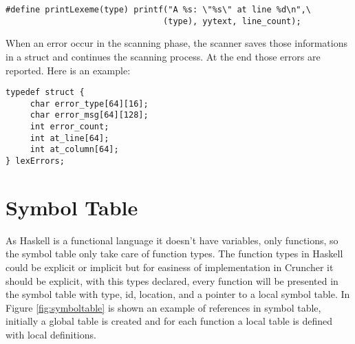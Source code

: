 \documentclass{article}
\begin{document}
\begin{verbatim}
#define printLexeme(type) printf("A %s: \"%s\" at line %d\n",\
                                (type), yytext, line_count);
\end{verbatim}

When an error occur in the scanning phase, the scanner saves those informations
in a struct and continues the scanning process. At the end those errors are
reported. Here is an example:

\begin{verbatim}
typedef struct {
     char error_type[64][16];
     char error_msg[64][128];
     int error_count;
     int at_line[64];
     int at_column[64];
} lexErrors;
\end{verbatim}

\section{Symbol Table}
As Haskell is a functional language it doesn't have variables, only functions,
so the symbol table only take care of function types. The function types in
Haskell could be explicit or implicit but for easiness of implementation in
Cruncher it should be explicit, with this types declared, every function will
be presented in the symbol table with type, id, location, and a pointer to a
local symbol table. In Figure \ref{fig:symboltable} is shown an example of
references in symbol table, initially a global table is created and for each
function a local table is defined with local definitions.
\end{document}
